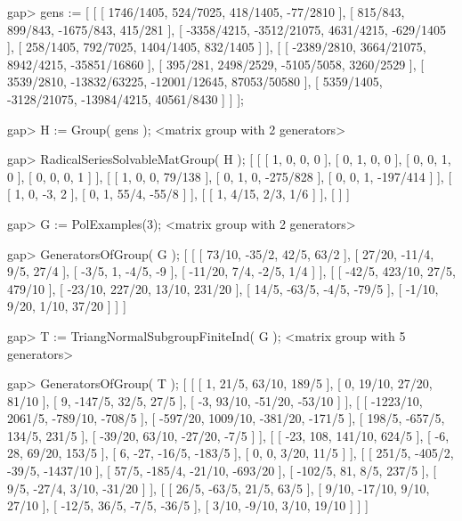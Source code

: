 \endexample


\beginexample
gap> gens := 
[ [ [ 1746/1405, 524/7025, 418/1405, -77/2810 ], 
    [ 815/843, 899/843, -1675/843, 415/281 ],
    [ -3358/4215, -3512/21075, 4631/4215, -629/1405 ],
    [ 258/1405, 792/7025, 1404/1405, 832/1405 ] ],
  [ [ -2389/2810, 3664/21075, 8942/4215, -35851/16860 ],
    [ 395/281, 2498/2529, -5105/5058, 3260/2529 ],
    [ 3539/2810, -13832/63225, -12001/12645, 87053/50580 ],
    [ 5359/1405, -3128/21075, -13984/4215, 40561/8430 ] ] ];

gap> H := Group( gens );
<matrix group with 2 generators>
     
gap> RadicalSeriesSolvableMatGroup( H );
[ [ [ 1, 0, 0, 0 ], [ 0, 1, 0, 0 ], [ 0, 0, 1, 0 ], [ 0, 0, 0, 1 ] ],
  [ [ 1, 0, 0, 79/138 ], [ 0, 1, 0, -275/828 ], [ 0, 0, 1, -197/414 ] ],
  [ [ 1, 0, -3, 2 ], [ 0, 1, 55/4, -55/8 ] ], 
  [ [ 1, 4/15, 2/3, 1/6 ] ], 
  [  ] ]
\endexample

\beginexample
gap> G := PolExamples(3);
<matrix group with 2 generators>

gap> GeneratorsOfGroup( G );
[ [ [ 73/10, -35/2, 42/5, 63/2 ], 
    [ 27/20, -11/4, 9/5, 27/4 ],
    [ -3/5, 1, -4/5, -9 ], 
    [ -11/20, 7/4, -2/5, 1/4 ] ],
  [ [ -42/5, 423/10, 27/5, 479/10 ], 
    [ -23/10, 227/20, 13/10, 231/20 ],
    [ 14/5, -63/5, -4/5, -79/5 ], 
    [ -1/10, 9/20, 1/10, 37/20 ] ] ]

gap> T := TriangNormalSubgroupFiniteInd( G );
<matrix group with 5 generators>

gap> GeneratorsOfGroup( T );
[ [ [ 1, 21/5, 63/10, 189/5 ], 
    [ 0, 19/10, 27/20, 81/10 ],
    [ 9, -147/5, 32/5, 27/5 ], 
    [ -3, 93/10, -51/20, -53/10 ] ],
  [ [ -1223/10, 2061/5, -789/10, -708/5 ], 
    [ -597/20, 1009/10, -381/20, -171/5 ],
    [ 198/5, -657/5, 134/5, 231/5 ], 
    [ -39/20, 63/10, -27/20, -7/5 ] ],
  [ [ -23, 108, 141/10, 624/5 ], 
    [ -6, 28, 69/20, 153/5 ],
    [ 6, -27, -16/5, -183/5 ], 
    [ 0, 0, 3/20, 11/5 ] ],
  [ [ 251/5, -405/2, -39/5, -1437/10 ], 
    [ 57/5, -185/4, -21/10, -693/20 ],
    [ -102/5, 81, 8/5, 237/5 ], 
    [ 9/5, -27/4, 3/10, -31/20 ] ],
  [ [ 26/5, -63/5, 21/5, 63/5 ], 
    [ 9/10, -17/10, 9/10, 27/10 ],
    [ -12/5, 36/5, -7/5, -36/5 ], 
    [ 3/10, -9/10, 3/10, 19/10 ] ] ]

\endexample























